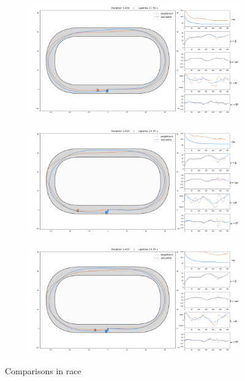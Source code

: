 \documentclass[a4paper, onecolumn, 12pt]{article}
\begin{document}
\begin{figure}[H]
    \centering
    \begin{subfigure}{0.9\textwidth}
        \centering
        \includegraphics[width=\textwidth]{assets/im/race1.png}
        \label{race1}
    \end{subfigure}
    \begin{subfigure}{0.9\textwidth}
        \centering
        \includegraphics[width=\textwidth]{assets/im/race7.png}
        \label{race7}
    \end{subfigure}
    \begin{subfigure}{0.9\textwidth}
        \centering
        \includegraphics[width=\textwidth]{assets/im/race5.png}
        \label{race5}
    \end{subfigure}
    \caption[short]{Comparisons in race}
    \label{race_ippodromo}
\end{figure}
\end{document}
